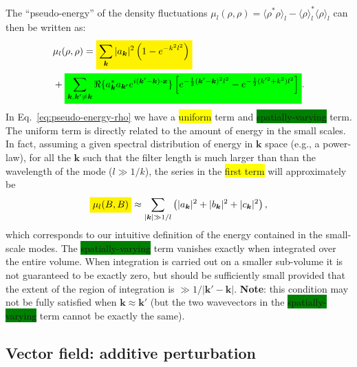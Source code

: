 \documentclass[]{article}
\newcommand{\mathcolorbox}[2]{\colorbox{#1}{$\displaystyle #2$}}
\newcommand{\bcdot}{\bm{\cdot}}
\begin{document}
%
The ``pseudo-energy'' of the density fluctuations $\mu_l(\rho,\rho) = \langle \rho^* \rho \rangle_l - \langle \rho \rangle_l^* \langle \rho \rangle_l$ can then be written as:
%
\begin{align}\label{eq:pseudo-energy-rho}
	&\mu_l(\rho,\rho) =  \mathcolorbox{yellow}{\sum_{\bm k} |a_{\bm k}|^2 \left( 1 -  e^{- k^2 l^2} \right)} \nonumber \\
	& + \mathcolorbox{green}{ \sum_{\bm k, \bm k' \neq \bm k} \Re \lbrace a_{\bm k}^* a_{\bm k'} e^{i (\bm k' - \bm k) \bcdot\bm x } \rbrace \left[ e^{-\frac{1}{2} (\bm k' - \bm k)^2 l^2} - e^{-\frac{1}{2} (k'^2 + k^2) l^2}\right]} .
\end{align}
%
In Eq.~\eqref{eq:pseudo-energy-rho} we have a \colorbox{yellow}{uniform} term and \colorbox{green}{spatially-varying} term. The uniform term is directly related to the amount of energy in the small scales. In fact, assuming a given spectral distribution of energy in $\bm k$ space (e.g., a power-law), 
for all the $\bm k$ such that the filter length is much larger than than  the wavelength of the mode ($l \gg 1/k$), the series in the \colorbox{yellow}{first term} will approximately be
%
\begin{align}
	\mathcolorbox{yellow}{\mu_l(B,B)} \approx \sum_{|\bm k| \gg 1/l} \left( |a_{\bm k}|^2 + |b_{\bm k}|^2 + |c_{\bm k}|^2 \right),
\end{align}
%
which corresponds to our intuitive definition of the energy contained in the small-scale modes. The \colorbox{green}{spatially-varying} term vanishes exactly when integrated over the entire volume. When integration is carried out on a smaller sub-volume it is not guaranteed to be exactly zero, but should be sufficiently small provided that the extent of the region of integration is $\gg 1/| \bm k' - \bm k|$. \textbf{Note}: this condition may not be fully satisfied when $\bm k \approx \bm k'$ (but the two wavevectors in the \colorbox{green}{spatially-varying} term cannot be exactly the same).

\subsection{Vector field: additive perturbation}
\end{document}
